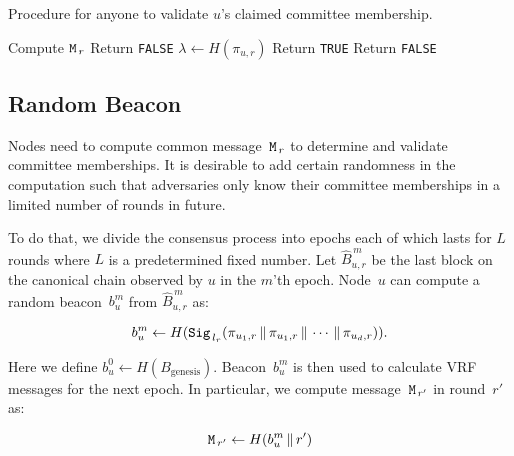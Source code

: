 \documentclass{article}
\begin{document}
\begin{algorithm}[H]
\caption{Procedure for anyone to validate $u$'s claimed committee membership.}
\label{alg:committee-valid}
\begin{spacing}{1.2}
\begin{algorithmic}[1]
    \vspace{1ex}
    \State Compute ${\tt M}_{\,r}$
    \vspace{1ex}
        \State Return {\tt FALSE}
    \EndIf
    \vspace{1ex}
    \State $\lambda\leftarrow H(\pi_{u,r})$
    \vspace{1ex}
    \If{$\lambda\leq\epsilon$}
        \State Return {\tt TRUE}
    \Else 
        \State Return {\tt FALSE}
    \EndIf
\end{algorithmic}
\end{spacing}
\end{algorithm}

\subsection{Random Beacon}
\label{sec:beacon}

Nodes need to compute common message~${\tt M}_{\,r}$ to determine and validate committee memberships. It is desirable to add certain randomness in the computation such that adversaries only know their committee memberships in a limited number of rounds in future.

To do that, we divide the consensus process into epochs each of which lasts for $L$ rounds where $L$ is a predetermined fixed number. Let $\hat{B}_{u,r}^{\,m}$ be the last block on the canonical chain observed by $u$ in the $m$'th epoch. Node~$u$ can compute a random beacon~$b_u^m$ from $\hat{B}_{u,r}^{\,m}$ as:

\begin{equation}
    b_u^m \leftarrow H({\tt Sig}_{\,l_r}(\pi_{u_1,r}\,\|\,\pi_{u_1,r}\,\|\,\cdots\,\|\,\pi_{u_d,r})).
\end{equation}

Here we define $b_u^0\leftarrow H(B_{\textrm{genesis}})$. Beacon~$b_u^m$ is then used to calculate VRF messages for the next epoch. In particular, we compute message~${\tt M}_{\,r'}$ in round~$r'$ as:

\begin{equation}
    {\tt M}_{\,r'} \leftarrow H(b_u^m\,\|\,r')
\end{equation}
\end{document}
